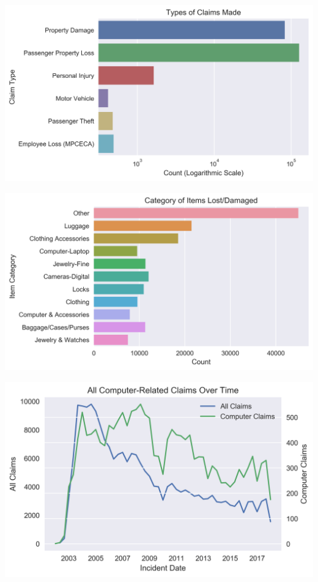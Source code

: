 \documentclass{beamer}
\begin{document}
\begin{frame}
	\includegraphics[keepaspectratio, width = \textwidth, height = \textheight]{../plots/log_type}
\end{frame}

\begin{frame}
	\includegraphics[keepaspectratio, width = \textwidth, height = \textheight]{../plots/items}
\end{frame}

\begin{frame}
	\includegraphics[keepaspectratio, width = \textwidth, height = \textheight]{../plots/computers}
\end{frame}
\end{document}
